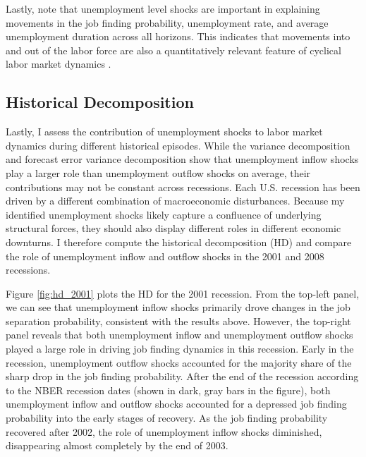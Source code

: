 \documentclass[12pt]{article}
\begin{document}
Lastly, note that unemployment level shocks are important in explaining movements in the job finding probability, unemployment rate, and average unemployment duration across all horizons. This indicates that movements into and out of the labor force are also a quantitatively relevant feature of cyclical labor market dynamics \citep{Elsby:2015aa}.

\subsection{Historical Decomposition}

Lastly, I assess the contribution of unemployment shocks to labor market dynamics during different historical episodes. While the variance decomposition and forecast error variance decomposition show that unemployment inflow shocks play a larger role than unemployment outflow shocks on average, their contributions may not be constant across recessions. Each U.S. recession has been driven by a different combination of macroeconomic disturbances. Because my identified unemployment shocks likely capture a confluence of underlying structural forces, they should also display different roles in different economic downturns. I therefore compute the historical decomposition (HD) and compare the role of unemployment inflow and outflow shocks in the 2001 and 2008 recessions.

Figure \ref{fig:hd_2001} plots the HD for the 2001 recession. From the top-left panel, we can see that unemployment inflow shocks primarily drove changes in the job separation probability, consistent with the results above. However, the top-right panel reveals that both unemployment inflow and unemployment outflow shocks played a large role in driving job finding dynamics in this recession. Early in the recession, unemployment outflow shocks accounted for the majority share of the sharp drop in the job finding probability. After the end of the recession according to the NBER recession dates (shown in dark, gray bars in the figure), both unemployment inflow and outflow shocks accounted for a depressed job finding probability into the early stages of recovery. As the job finding probability recovered after 2002, the role of unemployment inflow shocks diminished, disappearing almost completely by the end of 2003. 
\end{document}
